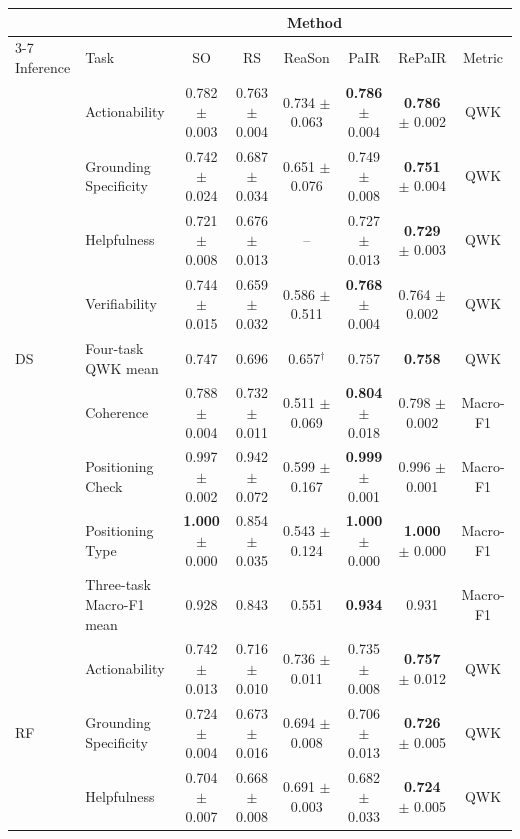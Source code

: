 \begin{table}[t]
\centering
\small
\setlength{\tabcolsep}{3.5pt}
\begin{tabular}{@{}llcccccc@{}}
\toprule
& & \multicolumn{5}{c}{Method} & \\
\cmidrule(lr){3-7}
Inference & Task & SO & RS & ReaSon & PaIR & RePaIR & Metric \\
\midrule
\multirow{9}{*}{DS} & Actionability & 0.782 $\pm$ 0.003 & 0.763 $\pm$ 0.004 & 0.734 $\pm$ 0.063 & \textbf{0.786} $\pm$ 0.004 & \textbf{0.786} $\pm$ 0.002 & QWK \\
& Grounding Specificity & 0.742 $\pm$ 0.024 & 0.687 $\pm$ 0.034 & 0.651 $\pm$ 0.076 & 0.749 $\pm$ 0.008 & \textbf{0.751} $\pm$ 0.004 & QWK \\
& Helpfulness & 0.721 $\pm$ 0.008 & 0.676 $\pm$ 0.013 & -- & 0.727 $\pm$ 0.013 & \textbf{0.729} $\pm$ 0.003 & QWK \\
& Verifiability & 0.744 $\pm$ 0.015 & 0.659 $\pm$ 0.032 & 0.586 $\pm$ 0.511 & \textbf{0.768} $\pm$ 0.004 & 0.764 $\pm$ 0.002 & QWK \\
\cmidrule(lr){2-8}
& Four-task QWK mean & 0.747 & 0.696 & 0.657$^{\dagger}$ & 0.757 & \textbf{0.758} & QWK \\
\cmidrule(lr){2-8}
& Coherence & 0.788 $\pm$ 0.004 & 0.732 $\pm$ 0.011 & 0.511 $\pm$ 0.069 & \textbf{0.804} $\pm$ 0.018 & 0.798 $\pm$ 0.002 & Macro-F1 \\
& Positioning Check & 0.997 $\pm$ 0.002 & 0.942 $\pm$ 0.072 & 0.599 $\pm$ 0.167 & \textbf{0.999} $\pm$ 0.001 & 0.996 $\pm$ 0.001 & Macro-F1 \\
& Positioning Type & \textbf{1.000} $\pm$ 0.000 & 0.854 $\pm$ 0.035 & 0.543 $\pm$ 0.124 & \textbf{1.000} $\pm$ 0.000 & \textbf{1.000} $\pm$ 0.000 & Macro-F1 \\
\cmidrule(lr){2-8}
& Three-task Macro-F1 mean & 0.928 & 0.843 & 0.551 & \textbf{0.934} & 0.931 & Macro-F1 \\
\midrule
\multirow{9}{*}{RF} & Actionability & 0.742 $\pm$ 0.013 & 0.716 $\pm$ 0.010 & 0.736 $\pm$ 0.011 & 0.735 $\pm$ 0.008 & \textbf{0.757} $\pm$ 0.012 & QWK \\
& Grounding Specificity & 0.724 $\pm$ 0.004 & 0.673 $\pm$ 0.016 & 0.694 $\pm$ 0.008 & 0.706 $\pm$ 0.013 & \textbf{0.726} $\pm$ 0.005 & QWK \\
& Helpfulness & 0.704 $\pm$ 0.007 & 0.668 $\pm$ 0.008 & 0.691 $\pm$ 0.003 & 0.682 $\pm$ 0.033 & \textbf{0.724} $\pm$ 0.005 & QWK \\

\end{tabular}
\end{table}
